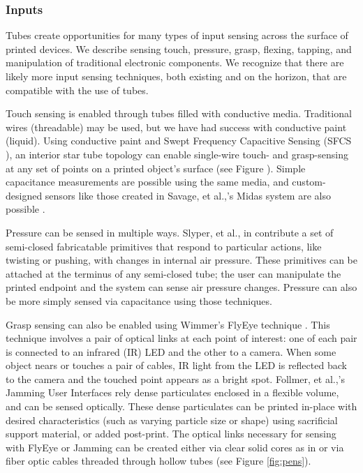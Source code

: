 \subsubsection{Inputs}

Tubes create opportunities for many types of input sensing across the surface of printed devices.  We describe sensing touch, pressure, grasp, flexing, tapping, and manipulation of traditional electronic components.  We recognize that there are likely more input sensing techniques, both existing and on the horizon, that are compatible with the use of tubes.

Touch sensing is enabled through tubes filled with conductive media.  Traditional wires (threadable) may be used, but we have had success with conductive paint (liquid).  Using conductive paint and Swept Frequency Capacitive Sensing (SFCS \cite{Sato-touche}), an interior star tube topology can enable single-wire touch- and grasp-sensing at any set of points on a printed object's surface (see Figure \cite{fig:toy}).  Simple capacitance measurements are possible using the same media, and custom-designed sensors like those created in Savage, et al.,'s Midas system are also possible \cite{Savage-midas}.

Pressure can be sensed in multiple ways.  Slyper, et al., in \cite{Slyper-pressure} contribute a set of semi-closed fabricatable primitives that respond to particular actions, like twisting or pushing, with changes in internal air pressure.    These primitives can be attached at the terminus of any semi-closed tube; the user can manipulate the printed endpoint and the system can sense air pressure changes.  Pressure can also be more simply sensed via capacitance using those techniques.

Grasp sensing can also be enabled using Wimmer's FlyEye technique \cite{Wimmer-flyeye}.  This technique involves a pair of optical links at each point of interest: one of each pair is connected to an infrared (IR) LED and the other to a camera.  When some object nears or touches a pair of cables, IR light from the LED is reflected back to the camera and the touched point appears as a bright spot.  Follmer, et al.,'s Jamming User Interfaces \cite{Follmer-jamming} rely dense particulates enclosed in a flexible volume, and can be sensed optically.  These dense particulates can be printed in-place with desired characteristics (such as varying particle size or shape) using sacrificial support material, or added post-print.  The optical links necessary for sensing with FlyEye or Jamming can be created either via clear solid cores as in \cite{Willis-printedoptics} or via fiber optic cables threaded through hollow tubes (see Figure \ref{fig:pens}).


